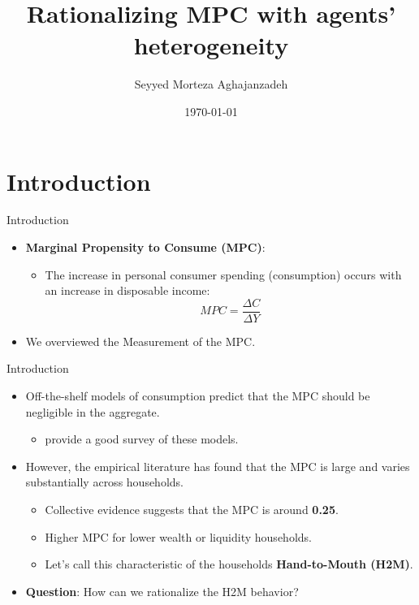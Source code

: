 \documentclass{beamer}
\title[Rationalizing MPC with agents’ heterogeneity]{ \textbf{Rationalizing MPC with agents’ heterogeneity}}
\author[Morteza]{Seyyed Morteza Aghajanzadeh}
\institute[HH Finance]{Households Finance}
\date{\today}
\begin{document}
\begin{frame}
    \titlepage
\end{frame}

\section{Introduction}
\begin{frame}{Introduction}
	\begin{itemize}
		\item<1-> \textbf{Marginal Propensity to Consume (MPC)}:
		\begin{itemize}
			\item The increase in personal consumer spending (consumption) occurs with an increase in disposable income:
			\begin{equation*}
				MPC = \frac{\Delta C}{\Delta Y}
			\end{equation*}
		\end{itemize}
		\item<2-> We overviewed the Measurement of the MPC.
	\end{itemize}
\end{frame}

\begin{frame}{Introduction}
	\begin{itemize}
		\item<1-> Off-the-shelf models of consumption predict that the MPC should be negligible in the aggregate. 
		\begin{itemize}
			\item \cite{heathcote2009quantitative} provide a good survey of these models.
		\end{itemize}
		\item<2-> However, the empirical literature has found that the MPC is large and varies substantially across households.
		\begin{itemize}
			\item Collective evidence suggests that the MPC is around \textbf{0.25}.
			\item Higher MPC for lower wealth or liquidity households.
			\item Let's call this characteristic of the households \textbf{Hand-to-Mouth (H2M)}.
		\end{itemize}
		\item<3-> \textbf{Question}: How can we rationalize the H2M behavior?
	\end{itemize}
\end{frame}
\end{document}
